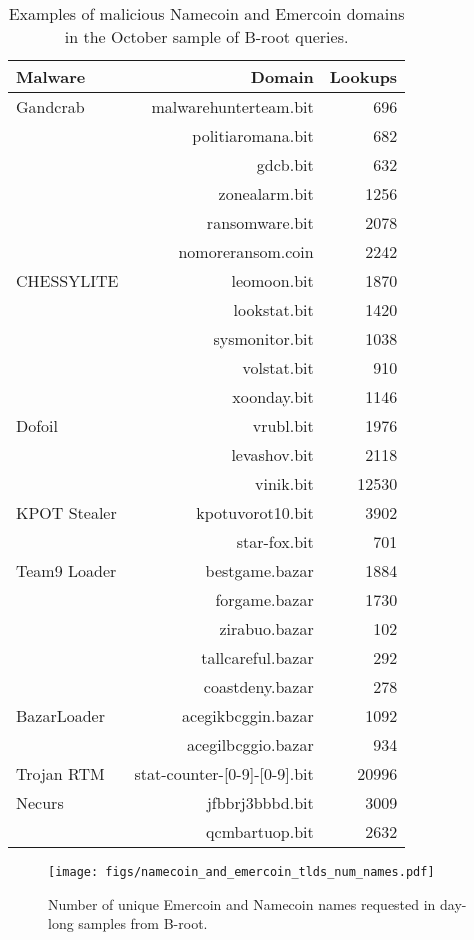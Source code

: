 \begin{table}
	\begin{tabular}{lrr}
		\toprule
		Malware & Domain & Lookups \\
		\midrule
		Gandcrab	&	malwarehunterteam.bit	&	696	\\
		&	politiaromana.bit	&	682	\\
		&	gdcb.bit	&	632	\\
		&	zonealarm.bit	&	1256	\\
		&	ransomware.bit	&	2078	\\
		&	nomoreransom.coin	&	2242	\\
		CHESSYLITE	&	leomoon.bit	&	1870	\\
		&	lookstat.bit	&	1420	\\
		&	sysmonitor.bit	&	1038	\\
		&	volstat.bit	&	910	\\
		&	xoonday.bit	&	1146	\\
		Dofoil	&	vrubl.bit	&	1976	\\
		&	levashov.bit	&	2118	\\
		&	vinik.bit	&	12530	\\
		KPOT Stealer	&	kpotuvorot10.bit	&	3902	\\
		&	star-fox.bit	&	701	\\
		Team9 Loader	&	bestgame.bazar	&	1884	\\
		&	forgame.bazar	&	1730	\\
		&	zirabuo.bazar	&	102	\\
		&	tallcareful.bazar	&	292	\\
		&	coastdeny.bazar	&	278	\\
		BazarLoader	&	acegikbcggin.bazar	&	1092	\\
		&	acegilbcggio.bazar	&	934	\\
		Trojan RTM	&	stat-counter-[0-9]-[0-9].bit	&	20996	\\
		Necurs	&	jfbbrj3bbbd.bit	&	3009	\\
		& qcmbartuop.bit & 2632 \\
		\bottomrule
	\end{tabular}
	\caption{Examples of malicious Namecoin and Emercoin domains in the October 
	sample of B-root 
		queries.}
	\label{tab:namecoin_emercoin}
\end{table}

\begin{figure}[t]
	\centering
	\texttt{[image: figs/namecoin\_and\_emercoin\_tlds\_num\_names.pdf]}
	\caption{Number of unique Emercoin and Namecoin names requested in day-long 
		samples from B-root.}
	\label{fig:namecoin_and_emercoin_names}
\end{figure}

